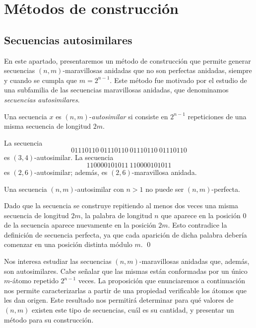 \documentclass[11pt]{article}
\begin{document}



\section{Métodos de construcción}

\subsection{Secuencias autosimilares}

En este apartado, presentaremos un método de construcción que permite generar
secuencias $(n,m)$-maravillosas anidadas que no son perfectas anidadas, siempre
y cuando se cumpla que $m = 2^{n - 1}$.
Este método fue motivado por el estudio de una subfamilia de las secuencias
maravillosas anidadas, que denominamos \emph{secuencias autosimilares}.

\begin{defi}
	Una secuencia $x$ es $(n,m)$-\emph{autosimilar} si consiste en $2^{n-1}$
	repeticiones de una misma secuencia de longitud $2m$.
\end{defi}

\begin{example}
	La secuencia \[ 01110110\ 01110110\ 01110110\ 01110110 \] es
	$(3,4)$-autosimilar.
	La secuencia \[ 110000101011 \ 110000101011 \] es $(2,6)$-autosimilar; además,
	es $(2,6)$-maravillosa anidada.
\end{example}

\begin{prop} \label{lemma:autosimilar-cannot-be-np}
	Una secuencia $(n,m)$-autosimilar con $n > 1$ no puede ser $(n,m)$-perfecta.
\end{prop}

\begin{demo}
	Dado que la secuencia se construye repitiendo al menos dos veces una misma
	secuencia de longitud $2m$, la palabra de longitud $n$ que aparece en la
	posición $0$ de la secuencia aparece nuevamente en la posición $2m$.
	Esto contradice la definición de secuencia perfecta, ya que cada aparición de
	dicha palabra debería comenzar en una posición distinta módulo $m$.
	\qed
\end{demo}

Nos interesa estudiar las secuencias $(n,m)$-maravillosas anidadas que, además,
son autosimilares.
Cabe señalar que las mismas están conformadas por un único $m$-átomo repetido
$2^{n-1}$ veces.
La proposición que enunciaremos a continuación nos permite caracterizarlas a
partir de una propiedad verificable los átomos que les dan origen.
Este resultado nos permitirá determinar para qué valores de $(n,m)$ existen
este tipo de secuencias, cuál es su cantidad, y presentar un método para su
construcción.
\end{document}

